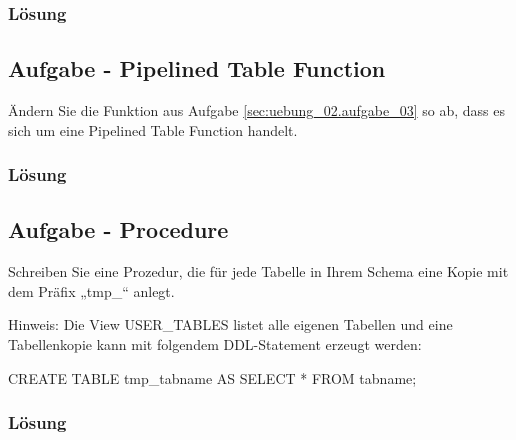 \subsubsection*{Lösung}
\label{sec:uebung_02.aufgabe_03.loesung}


\subsection{Aufgabe - Pipelined Table Function}
\label{sec:uebung_02.aufgabe_04}
Ändern Sie die Funktion aus Aufgabe \ref{sec:uebung_02.aufgabe_03} so ab, dass es sich um eine Pipelined Table Function handelt.

\subsubsection*{Lösung}
\label{sec:uebung_02.aufgabe_04.loesung}


\subsection{Aufgabe - Procedure}
\label{sec:uebung_02.aufgabe_05}
Schreiben Sie eine Prozedur, die für jede Tabelle in Ihrem Schema eine Kopie mit dem Präfix „tmp\_“ anlegt.

Hinweis: Die View USER\_TABLES listet alle eigenen Tabellen und eine Tabellenkopie kann mit folgendem DDL-Statement erzeugt werden:
\begin{sqlcode}
CREATE TABLE tmp_tabname AS
  SELECT *
  FROM tabname;
\end{sqlcode}

\subsubsection*{Lösung}
\label{sec:uebung_02.aufgabe_05.loesung}


